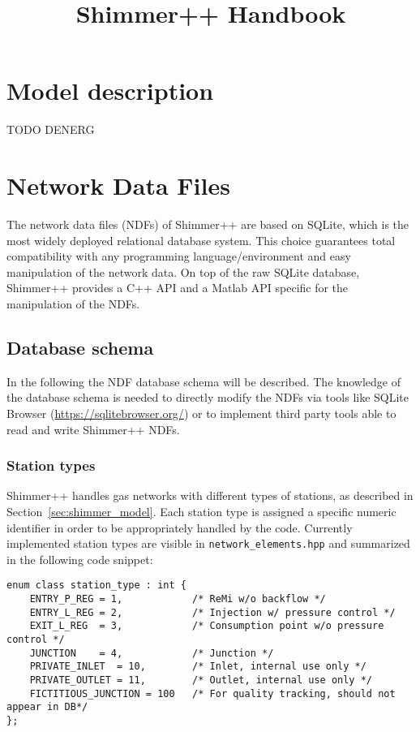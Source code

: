 \documentclass[10pt]{article}
\title{Shimmer++ Handbook}
\begin{document}
\maketitle

\section{Model description}
TODO DENERG

\section{Network Data Files}
The network data files (NDFs) of Shimmer++ are based on SQLite, which is the
most widely deployed relational database system. This choice guarantees total
compatibility with any programming language/environment and easy manipulation of
the network data. On top of the raw SQLite database, Shimmer++ provides a C++
API and a Matlab API specific for the manipulation of the NDFs.

\subsection{Database schema}
In the following the NDF database schema will be described. The knowledge of
the database schema is needed to directly modify the NDFs via tools like
SQLite Browser (\url{https://sqlitebrowser.org/}) or to implement third party
tools able to read and write Shimmer++ NDFs.

\subsubsection{Station types}
Shimmer++ handles gas networks with different types of stations, as described
in Section~\ref{sec:shimmer_model}. Each station type is assigned a specific
numeric identifier in order to be appropriately handled by the code. Currently
implemented station types are visible in \texttt{network\_elements.hpp} and
summarized in the following code snippet: 

\begin{verbatim}
enum class station_type : int {
    ENTRY_P_REG = 1,            /* ReMi w/o backflow */
    ENTRY_L_REG = 2,            /* Injection w/ pressure control */
    EXIT_L_REG  = 3,            /* Consumption point w/o pressure control */
    JUNCTION    = 4,            /* Junction */
    PRIVATE_INLET  = 10,        /* Inlet, internal use only */
    PRIVATE_OUTLET = 11,        /* Outlet, internal use only */
    FICTITIOUS_JUNCTION = 100   /* For quality tracking, should not appear in DB*/
};
\end{verbatim}
\end{document}
